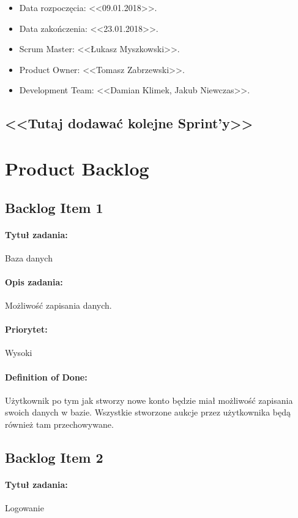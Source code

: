 \documentclass[a4paper]{article}
\begin{document}
	\begin{itemize}
		\item Data rozpoczęcia: <<09.01.2018>>.
		\item  Data zakończenia: <<23.01.2018>>.
		\item Scrum Master: <<Łukasz Myszkowski>>.
		\item Product Owner: <<Tomasz Zabrzewski>>.
		\item Development Team: <<Damian Klimek, Jakub Niewczas>>.
	\end{itemize}

	
	\subsection*{<<Tutaj dodawać kolejne Sprint'y>>}
	
	\section{Product Backlog}
	
	
	\subsection{Backlog Item 1}
	\paragraph{Tytuł zadania:} Baza danych
	\paragraph{Opis zadania:} Możliwość zapisania danych.
	\paragraph{Priorytet:} Wysoki
	\paragraph{Definition of Done:} Użytkownik po tym jak stworzy nowe konto będzie miał możliwość zapisania swoich danych w bazie. Wszystkie stworzone aukcje przez użytkownika będą również tam przechowywane.
	
	\subsection{Backlog Item 2}
	\paragraph{Tytuł zadania:} Logowanie
\end{document}
